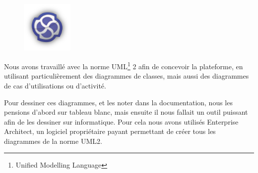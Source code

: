 \begin{figure}
	\includegraphics[width=2.5cm]{contents/images/logoEnterpriseArchitect.png}
\end{figure}
Nous avons travaillé avec la norme UML\footnote{Unified Modelling Language} 2 afin de concevoir la plateforme, en utilisant particulièrement des diagrammes de classes, mais aussi des diagrammes de cas d'utilisations ou d'activité. 

Pour dessiner ces diagrammes, et les noter dans la documentation, nous les pensions d'abord sur tableau blanc, mais ensuite il nous fallait un outil puissant afin de les dessiner sur informatique. Pour cela nous avons utilisés Enterprise Architect, un logiciel propriétaire payant permettant de créer tous les diagrammes de la norme UML2.
